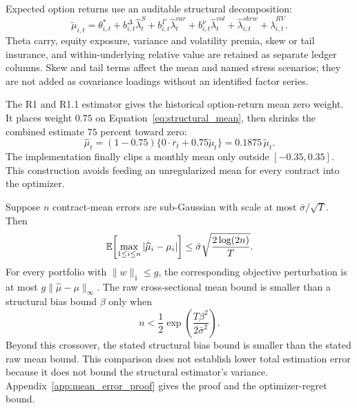 Expected option returns use an auditable structural decomposition:
\begin{equation}
  \widetilde\mu_{i,t}
  =\theta^*_{i,t}
  +b^\Delta_{i,t}\widehat\lambda^S_t
  +b^\Gamma_{i,t}\widehat\lambda^{var}_t
  +b^\nu_{i,t}\widehat\lambda^{vol}_t
  +\widehat\lambda^{skew}_{i,t}
  +\widehat\lambda^{RV}_{i,t}.
  \label{eq:structural_mean}
\end{equation}
Theta carry, equity exposure, variance and volatility premia, skew or tail insurance, and
within-underlying relative value are retained as separate ledger columns. Skew and tail
terms affect the mean and named stress scenarios; they are not added as covariance
loadings without an identified factor series.

The R1 and R1.1 estimator gives the historical option-return mean zero weight. It
places weight \(0.75\) on Equation~\eqref{eq:structural_mean}, then shrinks the combined
estimate \(75\) percent toward zero:
\begin{equation}
  \widehat\mu_t
  =(1-0.75)\{0\cdot\overline r_t+0.75\widetilde\mu_t\}
  =0.1875\,\widetilde\mu_t.
  \label{eq:mean_shrinkage}
\end{equation}
The implementation finally clips a monthly mean only outside \([-0.35,0.35]\). This
construction avoids feeding an unregularized mean for every contract into the optimizer.

\begin{proposition}
Suppose \(n\) contract-mean errors are sub-Gaussian with scale at most
\(\bar\sigma/\sqrt T\). Then
\begin{equation}
  \mathbb{E}\!\left[\max_{1\le i\le n}|\widehat\mu_i-\mu_i|\right]
  \le \bar\sigma\sqrt{\frac{2\log(2n)}{T}}.
  \label{eq:max_mean_error}
\end{equation}
For every portfolio with \(\|w\|_1\le g\), the corresponding objective perturbation is
at most \(g\|\widehat\mu-\mu\|_\infty\). The raw cross-sectional mean bound is smaller
than a structural bias bound \(\beta\) only when
\begin{equation}
  n<\frac{1}{2}\exp\!\left(\frac{T\beta^2}{2\bar\sigma^2}\right).
  \label{eq:bias_variance_crossover}
\end{equation}
Beyond this crossover, the stated structural bias bound is smaller than the stated raw
mean bound. This comparison does not establish lower total estimation error because it
does not bound the structural estimator's variance. Appendix~\ref{app:mean_error_proof}
gives the proof and the optimizer-regret bound.
\end{proposition}

